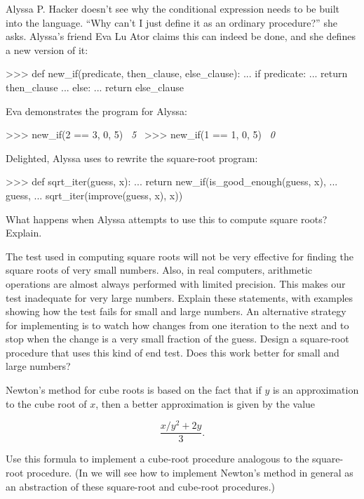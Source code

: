 \begin{exerciseGroup}
\label{Exercise 1.6}
 Alyssa P. Hacker doesn't see why
the conditional expression needs to be built into the language.  ``Why can't I
just define it as an ordinary procedure?'' she asks.  Alyssa's friend Eva Lu
Ator claims this can indeed be done, and she defines a new version of it:

\begin{codeBlock}
>>> def new_if(predicate, then_clause, else_clause):
...     if predicate:
...         return then_clause
...     else:
...         return else_clause
\end{codeBlock}

Eva demonstrates the program for Alyssa:

\begin{codeBlock}
>>> new_if(2 == 3, 0, 5)
~\textit{5}~
>>> new_if(1 == 1, 0, 5)
~\textit{0}~
\end{codeBlock}

Delighted, Alyssa uses  to rewrite the square-root program:

\begin{codeBlock}
>>> def sqrt_iter(guess, x):
...     return new_if(is_good_enough(guess, x),
...                   guess,
...                   sqrt_iter(improve(guess, x), x))
\end{codeBlock}

What happens when Alyssa attempts to use this to compute square roots?
Explain.

\label{Exercise 1.7}
 The  test used
in computing square roots will not be very effective for finding the square
roots of very small numbers.  Also, in real computers, arithmetic operations
are almost always performed with limited precision.  This makes our test
inadequate for very large numbers.  Explain these statements, with examples
showing how the test fails for small and large numbers.  An alternative
strategy for implementing  is to watch how 
changes from one iteration to the next and to stop when the change is a very
small fraction of the guess.  Design a square-root procedure that uses this
kind of end test.  Does this work better for small and large numbers?

\label{Exercise 1.8}
 Newton's method for cube roots is
based on the fact that if \( y \) is an approximation to the cube root of \( x \),
then a better approximation is given by the value

$$\frac{{x / y^2} + 2y}{3}.$$

\noindent
Use this formula to implement a cube-root procedure analogous to the
square-root procedure.  (In  we will see how to implement
Newton's method in general as an abstraction of these square-root and cube-root
procedures.)
\end{exerciseGroup}


